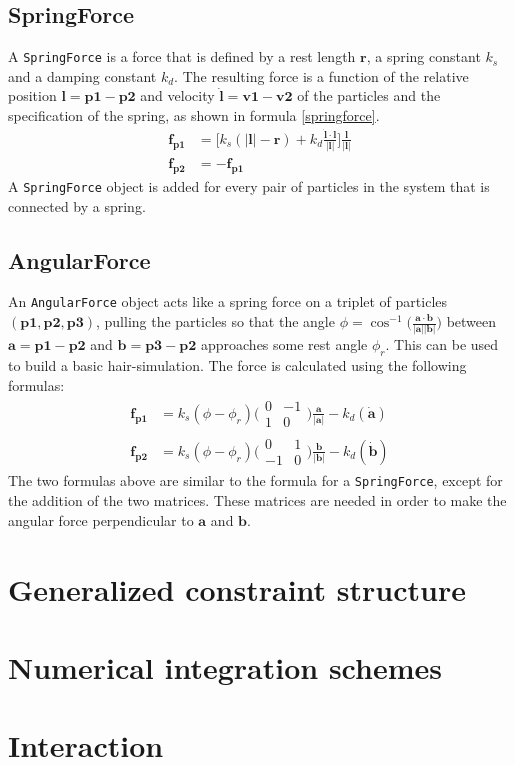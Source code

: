 \documentclass[a4paper,twoside,11pt,twocolumn]{article}
\begin{document}
\subsection{SpringForce}
A \texttt{SpringForce} is a force that is defined by a rest length $\mathbf{r}$, a spring constant $k_s$ and a damping constant $k_d$. The resulting force is a function of the relative position $\mathbf{l = p1 - p2}$ and velocity $\mathbf{\dot{l} = v1 - v2}$ of the particles and the specification of the spring, as shown in formula \ref{springforce}.
\begin{align} \label{springforce}
	\mathbf{f_{p1}} &= \bigg[k_s(|\mathbf{l}| - \mathbf{r}) + k_d \frac{\dot{\mathbf{l}}\cdot \mathbf{l}}{|\mathbf{l}|}\bigg]\frac{\mathbf{l}}{|\mathbf{l}|}\\
	\mathbf{f_{p2}} &= -\mathbf{f_{p1}}
\end{align}
A \texttt{SpringForce} object is added for every pair of particles in the system that is connected by a spring.

\subsection{AngularForce}
An \texttt{AngularForce} object acts like a spring force on a triplet of particles $(\mathbf{p1, p2, p3})$, pulling the particles so that the angle $\phi = \cos^{-1}\bigl(\frac{\mathbf{a} \cdot \mathbf{b}}{|\mathbf{a}||\mathbf{b}|}\bigr)$ between $\mathbf{a} = \mathbf{p1} - \mathbf{p2} $ and $\mathbf{b} = \mathbf{p3} - \mathbf{p2}$ approaches some rest angle $\phi_r$. This can be used to build a basic hair-simulation. The force is calculated using the following formulas:
\begin{align}
	\mathbf{f_{p1}} &= k_s (\phi - \phi_r) \biggl(\begin{matrix} 0 & -1 \\ 1 & 0\end{matrix} \biggr) \frac{\mathbf{a}}{|\mathbf{a}|} - k_d (\dot{\mathbf{a}})\\
	\mathbf{f_{p2}} &= k_s (\phi - \phi_r) \biggl(\begin{matrix} 0 & 1 \\ -1 & 0\end{matrix} \biggr) \frac{\mathbf{b}}{|\mathbf{b}|} - k_d (\dot{\mathbf{b}})
\end{align}
The two formulas above are similar to the formula for a \texttt{SpringForce}, except for the addition of the two matrices. These matrices are needed in order to make the angular force perpendicular to $\mathbf{a}$ and $\mathbf{b}$.

\section{Generalized constraint structure}

\section{Numerical integration schemes}
\label{Numerical_schemes}

\section{Interaction}
\end{document}
